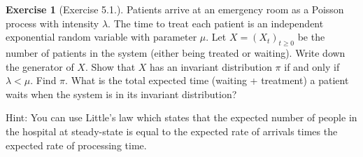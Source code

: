 \documentclass[12pt]{article}
\theoremstyle{definition}
\newtheorem{exer}{Exercise}
\theoremstyle{remark}
\begin{document}
\begin{exer}[Exercise 5.1.]

    Patients arrive at an emergency room as a Poisson process with intensity $\lambda$. The time to treat each patient is an independent exponential random variable with parameter $\mu$. Let $X = (X_{t})_{t\geq 0}$ be the number of patients in the system (either being treated or waiting). Write down the generator of $X$.
Show that $X$ has an invariant distribution $\pi$ if and only if $\lambda < \mu$. Find $\pi$. What is the total expected time (waiting + treatment) a patient waits when the system is in its invariant distribution?

Hint: You can use Little's law which states that the expected number of people in the hospital at steady-state is equal to the expected rate of arrivals times the expected rate of processing time.
  \end{exer}
\end{document}
